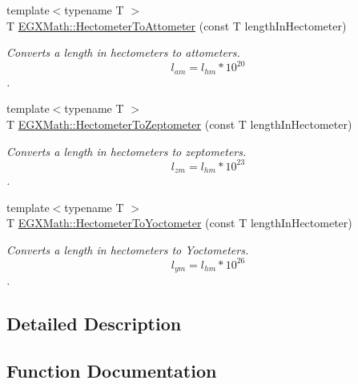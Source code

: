 \begin{DoxyCompactItemize}
{\footnotesize template$<$typename T $>$ }\\T \mbox{\hyperlink{group___e_g_x_math-_conversions-_length_conversions-_hectometer-_s_i_ga86348086f2a5b950cad06205d42bed4e}{E\+G\+X\+Math\+::\+Hectometer\+To\+Attometer}} (const T length\+In\+Hectometer)
\begin{DoxyCompactList}\small\item\em Converts a length in hectometers to attometers. \[ l_{am}=l_{hm} * 10^{20} \]. \end{DoxyCompactList}\item 
{\footnotesize template$<$typename T $>$ }\\T \mbox{\hyperlink{group___e_g_x_math-_conversions-_length_conversions-_hectometer-_s_i_ga8ad2a40e4868b0a8de07e0e6f416f025}{E\+G\+X\+Math\+::\+Hectometer\+To\+Zeptometer}} (const T length\+In\+Hectometer)
\begin{DoxyCompactList}\small\item\em Converts a length in hectometers to zeptometers. \[ l_{zm}=l_{hm} * 10^{23} \]. \end{DoxyCompactList}\item 
{\footnotesize template$<$typename T $>$ }\\T \mbox{\hyperlink{group___e_g_x_math-_conversions-_length_conversions-_hectometer-_s_i_ga64c07f341a87b8ebd6a7c10129e3a924}{E\+G\+X\+Math\+::\+Hectometer\+To\+Yoctometer}} (const T length\+In\+Hectometer)
\begin{DoxyCompactList}\small\item\em Converts a length in hectometers to Yoctometers. \[ l_{ym}=l_{hm} * 10^{26} \]. \end{DoxyCompactList}\end{DoxyCompactItemize}


\subsection{Detailed Description}


\subsection{Function Documentation}
\mbox{\label{group___e_g_x_math-_conversions-_length_conversions-_hectometer-_s_i_ga86348086f2a5b950cad06205d42bed4e}} 
